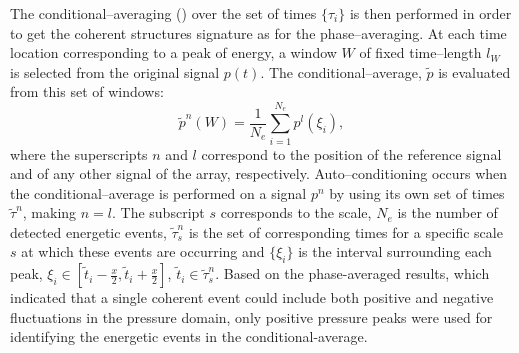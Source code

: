 The conditional--averaging () over the set of times $\{\tau_{i}\}$ is then performed in order to get the coherent structures signature as for the phase--averaging.
At each time location corresponding to a peak of energy, a window $W$ of fixed time--length $l_{W}$ is selected from the original signal $p \left( t \right)$. The conditional--average, $\tilde{p}$ is evaluated from this set of windows:
\begin{equation} \label{eqn:ensembleAverage}
	\tilde{p}^n\left( W \right) = \frac{1}{N_e} \sum^{N_e}_{i = 1} p^l \left(\xi_{i}\right),
\end{equation}
where the superscripts $n$ and $l$ correspond to the position of the reference signal and of any other signal of the array, respectively.
Auto--conditioning occurs when the conditional--average is performed on a signal $p^{n}$ by using its own set of times ${\tilde{\tau}^n}$, making $n = l$. 
The subscript $s$ corresponds to the scale, $N_e$ is the number of detected energetic events, $\tilde{\tau}^n_{s}$ is the set of corresponding times for a specific scale $s$ at which these events are occurring and $\{\xi_{i}\}$ is the interval surrounding each peak, $\xi_{i} \in \left[ \tilde{t}_{i} - \frac{x}{2}, \tilde{t}_{i} + \frac{x}{2} \right]$, $\tilde{t}_{i} \in \tilde{\tau}^n_{s}$.
Based on the phase-averaged results, which indicated that a single coherent event could include both positive and negative fluctuations in the pressure domain, only positive pressure peaks were used for identifying the energetic events in the conditional-average.
%
